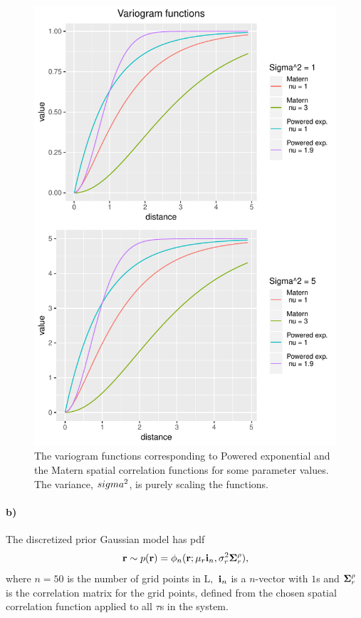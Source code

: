 \begin{figure}
    \centering
    \includegraphics[scale=0.95]{figures/variograms.pdf}
    \caption{The variogram functions corresponding to Powered exponential and the Matern spatial correlation functions for some parameter values. The variance, $\\sigma^2$, is purely scaling the functions.}
    \label{fig:variograms}
\end{figure}

\paragraph{b)}
The discretized prior Gaussian model has pdf
\begin{equation}
    \boldsymbol{\mathbf{r}} \sim p(\boldsymbol{\mathbf{r}}) = \phi_n(\boldsymbol{\mathbf{r}}; \mu_r \boldsymbol{\mathbf{i}}_n, \sigma_r^2\boldsymbol{\mathbf{\Sigma}}_r^{\rho}),
\end{equation}
where $n = 50$ is the number of grid points in $\text{L},$ $\boldsymbol{\mathbf{i}}_n$ is a $n$-vector with $1$s and $\boldsymbol{\mathbf{\Sigma}}_r^{\rho}$ is the correlation matrix for the grid points, defined from the chosen spatial correlation function applied to all $\tau$s in the system.

